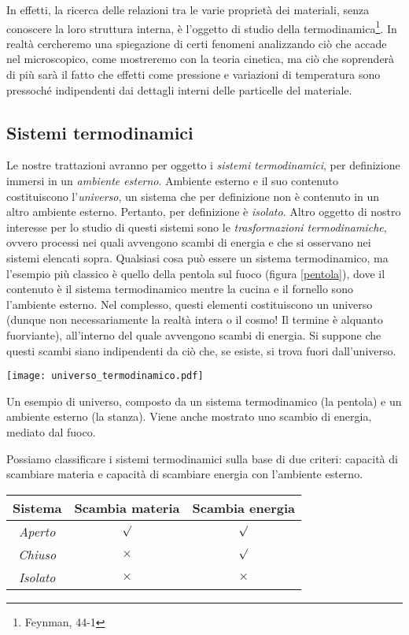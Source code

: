 In effetti, la ricerca delle relazioni tra le varie proprietà
dei materiali, senza conoscere la loro struttura interna, è l'oggetto
di studio della termodinamica\footnote{Feynman, 44-1}. In realtà cercheremo una spiegazione di certi fenomeni
analizzando ciò che accade nel microscopico, come mostreremo con la
teoria cinetica, ma ciò che soprenderà di più sarà il fatto che effetti
come pressione e variazioni di temperatura sono pressoché indipendenti
dai dettagli interni delle particelle del materiale.

\subsection{Sistemi termodinamici}
Le nostre trattazioni avranno per oggetto i \textit{sistemi termodinamici}, per
definizione immersi in un \textit{ambiente esterno}. Ambiente esterno e il suo
contenuto costituiscono l'\textit{universo}, un sistema che per definizione non
è contenuto in un altro ambiente esterno. Pertanto, per definizione è \textit{isolato}.
Altro oggetto di nostro interesse per lo studio di questi sistemi sono le
\textit{trasformazioni termodinamiche}, ovvero processi nei quali avvengono
scambi di energia e che si osservano nei sistemi elencati sopra. Qualsiasi
cosa può essere un sistema termodinamico, ma l'esempio più classico è quello
della pentola sul fuoco (figura \ref{pentola}), dove il contenuto è il sistema termodinamico mentre
la cucina e il fornello sono l'ambiente esterno. Nel complesso, questi
elementi costituiscono un universo (dunque non necessariamente la
realtà intera o il cosmo! Il termine è alquanto fuorviante), all'interno del quale avvengono scambi di
energia. Si suppone che questi scambi siano indipendenti da ciò che, se esiste,
si trova fuori dall'universo.

\begin{marginfigure}
    \centering
    \texttt{[image: universo\_termodinamico.pdf]}
    \caption{Un esempio di universo, composto da un sistema termodinamico
    (la pentola) e un ambiente esterno (la stanza). Viene anche mostrato uno
    scambio di energia, mediato dal fuoco.}
    \label{pentola}
\end{marginfigure}


Possiamo classificare i sistemi termodinamici sulla base di due criteri: capacità
di scambiare materia e capacità di scambiare energia con l'ambiente esterno.

\begin{center}
    \begin{tabular}{c | c | c}
        Sistema & Scambia materia & Scambia energia \\
        \hline
        \hline
        \textit{Aperto} & $\surd$ & $\surd$ \\
        \hline
        \textit{Chiuso} & $\times$ & $\surd$ \\
        \hline
        \textit{Isolato} & $\times$ & $\times$
    \end{tabular}
\end{center}

